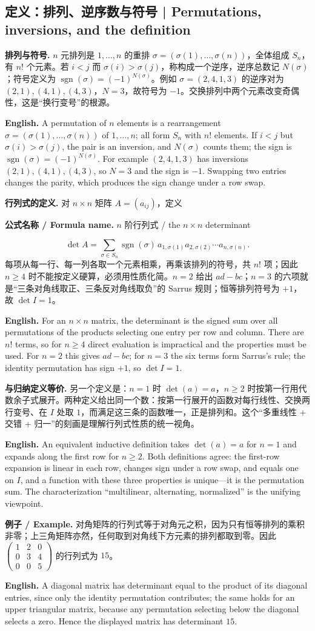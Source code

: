 \documentclass[UTF8,11pt,a4paper]{ctexart}
\newcommand{\EN}[1]{\par\noindent\textbf{English.} #1\par}
\newcommand{\FORMULA}[2]{\par\noindent\textbf{公式名称 / Formula name.} #1 / #2\par}
\newcommand{\EX}[2]{\par\noindent\textbf{例子 / Example.} #1\par\EN{#2}}
\begin{document}
\subsection{定义：排列、逆序数与符号 | Permutations, inversions, and the definition}
\noindent\textbf{排列与符号.} $n$ 元排列是 $1,\dots,n$ 的重排 $\sigma=(\sigma(1),\dots,\sigma(n))$，全体组成 $S_n$，有 $n!$ 个元素。若 $i<j$ 而 $\sigma(i)>\sigma(j)$，称构成一个逆序，逆序总数记 $N(\sigma)$；符号定义为 $\operatorname{sgn}(\sigma)=(-1)^{N(\sigma)}$。例如 $\sigma=(2,4,1,3)$ 的逆序对为 $(2,1),(4,1),(4,3)$，$N=3$，故符号为 $-1$。交换排列中两个元素改变奇偶性，这是“换行变号”的根源。
\EN{A permutation of $n$ elements is a rearrangement $\sigma=(\sigma(1),\dots,\sigma(n))$ of $1,\dots,n$; all form $S_n$ with $n!$ elements. If $i<j$ but $\sigma(i)>\sigma(j)$, the pair is an inversion, and $N(\sigma)$ counts them; the sign is $\operatorname{sgn}(\sigma)=(-1)^{N(\sigma)}$. For example $(2,4,1,3)$ has inversions $(2,1),(4,1),(4,3)$, so $N=3$ and the sign is $-1$. Swapping two entries changes the parity, which produces the sign change under a row swap.}
\noindent\textbf{行列式的定义.} 对 $n\times n$ 矩阵 $A=(a_{ij})$，定义
\FORMULA{$n$ 阶行列式}{the $n\times n$ determinant}
\[
\det A=\sum_{\sigma\in S_n}\operatorname{sgn}(\sigma)\,a_{1,\sigma(1)}a_{2,\sigma(2)}\cdots a_{n,\sigma(n)}.
\]
每项从每一行、每一列各取一个元素相乘，再乘该排列的符号，共 $n!$ 项；因此 $n\ge4$ 时不能按定义硬算，必须用性质化简。$n=2$ 给出 $ad-bc$；$n=3$ 的六项就是“三条对角线取正、三条反对角线取负”的 Sarrus 规则；恒等排列符号为 $+1$，故 $\det I=1$。
\EN{For an $n\times n$ matrix, the determinant is the signed sum over all permutations of the products selecting one entry per row and column. There are $n!$ terms, so for $n\ge4$ direct evaluation is impractical and the properties must be used. For $n=2$ this gives $ad-bc$; for $n=3$ the six terms form Sarrus's rule; the identity permutation has sign $+1$, so $\det I=1$.}
\noindent\textbf{与归纳定义等价.} 另一个定义是：$n=1$ 时 $\det(a)=a$，$n\ge2$ 时按第一行用代数余子式展开。两种定义给出同一个数：按第一行展开的函数对每行线性、交换两行变号、在 $I$ 处取 $1$，而满足这三条的函数唯一，正是排列和。这个“多重线性 + 交错 + 归一”的刻画是理解行列式性质的统一视角。
\EN{An equivalent inductive definition takes $\det(a)=a$ for $n=1$ and expands along the first row for $n\ge2$. Both definitions agree: the first-row expansion is linear in each row, changes sign under a row swap, and equals one on $I$, and a function with these three properties is unique—it is the permutation sum. The characterization ``multilinear, alternating, normalized'' is the unifying viewpoint.}
\EX{对角矩阵的行列式等于对角元之积，因为只有恒等排列的乘积非零；上三角矩阵亦然，任何取到对角线下方元素的排列都取到零。因此 $\begin{pmatrix}1&2&0\\0&3&4\\0&0&5\end{pmatrix}$ 的行列式为 $15$。}{A diagonal matrix has determinant equal to the product of its diagonal entries, since only the identity permutation contributes; the same holds for an upper triangular matrix, because any permutation selecting below the diagonal selects a zero. Hence the displayed matrix has determinant $15$.}
\end{document}
